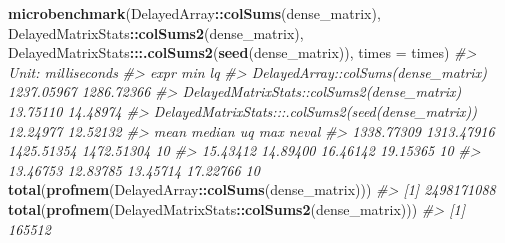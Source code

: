 \documentclass[]{book}
\newenvironment{Shaded}{\begin{snugshade}}{\end{snugshade}}
\newcommand{\KeywordTok}[1]{\textcolor[rgb]{0.13,0.29,0.53}{\textbf{#1}}}
\newcommand{\DataTypeTok}[1]{\textcolor[rgb]{0.13,0.29,0.53}{#1}}
\newcommand{\CommentTok}[1]{\textcolor[rgb]{0.56,0.35,0.01}{\textit{#1}}}
\newcommand{\OperatorTok}[1]{\textcolor[rgb]{0.81,0.36,0.00}{\textbf{#1}}}
\newcommand{\NormalTok}[1]{#1}
\begin{document}
\begin{Shaded}
\begin{Highlighting}[]
\KeywordTok{microbenchmark}\NormalTok{(DelayedArray}\OperatorTok{::}\KeywordTok{colSums}\NormalTok{(dense_matrix),}
\NormalTok{               DelayedMatrixStats}\OperatorTok{::}\KeywordTok{colSums2}\NormalTok{(dense_matrix),}
\NormalTok{               DelayedMatrixStats}\OperatorTok{:::}\KeywordTok{.colSums2}\NormalTok{(}\KeywordTok{seed}\NormalTok{(dense_matrix)),}
               \DataTypeTok{times =}\NormalTok{ times)}
\CommentTok{#> Unit: milliseconds}
\CommentTok{#>                                                expr        min         lq}
\CommentTok{#>                 DelayedArray::colSums(dense_matrix) 1237.05967 1286.72366}
\CommentTok{#>          DelayedMatrixStats::colSums2(dense_matrix)   13.75110   14.48974}
\CommentTok{#>  DelayedMatrixStats:::.colSums2(seed(dense_matrix))   12.24977   12.52132}
\CommentTok{#>        mean     median         uq        max neval}
\CommentTok{#>  1338.77309 1313.47916 1425.51354 1472.51304    10}
\CommentTok{#>    15.43412   14.89400   16.46142   19.15365    10}
\CommentTok{#>    13.46753   12.83785   13.45714   17.22766    10}
\KeywordTok{total}\NormalTok{(}\KeywordTok{profmem}\NormalTok{(DelayedArray}\OperatorTok{::}\KeywordTok{colSums}\NormalTok{(dense_matrix)))}
\CommentTok{#> [1] 2498171088}
\KeywordTok{total}\NormalTok{(}\KeywordTok{profmem}\NormalTok{(DelayedMatrixStats}\OperatorTok{::}\KeywordTok{colSums2}\NormalTok{(dense_matrix)))}
\CommentTok{#> [1] 165512}


\end{Highlighting}
\end{Shaded}
\end{document}
